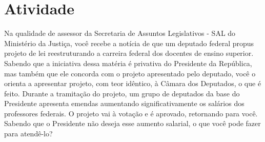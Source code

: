 \documentclass{article}
\begin{document}
\section{Atividade}

Na qualidade de assessor da Secretaria de Assuntos Legislativos - SAL do Ministério da Justiça, você recebe a notícia de que um deputado federal propus projeto de lei reestruturando a carreira federal dos docentes de ensino superior. Sabendo que a iniciativa dessa matéria é privativa do Presidente da República, mas também que ele concorda com o projeto apresentado pelo deputado, você o orienta a apresentar projeto, com teor idêntico, à Câmara dos Deputados, o que é feito. Durante a tramitação do projeto, um grupo de deputados da base do Presidente apresenta emendas aumentando significativamente os salários dos professores federais. O projeto vai à votação e é aprovado, retornando para você. Sabendo que o Presidente não deseja esse aumento salarial, o que você pode fazer para atendê-lo?

\printbibliography
\end{document}
